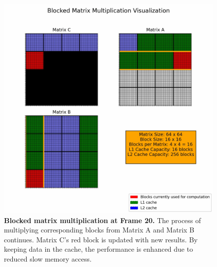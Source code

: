 \begin{figure}[htbp]
  \centering
  \includegraphics[width=0.8\linewidth]{images/bmmco_animation_20.jpg}
  \caption{\textbf{Blocked matrix multiplication at Frame 20.} The process of multiplying corresponding blocks from Matrix A and Matrix B continues. Matrix C’s red block is updated with new results. By keeping data in the cache, the performance is enhanced due to reduced slow memory access.}
  \label{fig:frame20}
\end{figure}
